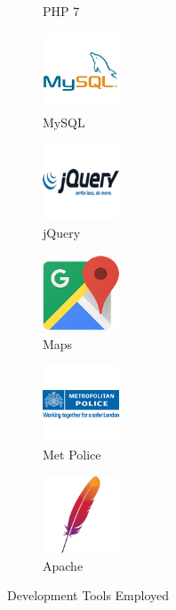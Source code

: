 \begin{figure}[H]
\begin{subfigure}[t]{0.9in}
		\caption{PHP 7}\label{fig:PHP_7}
	\end{subfigure}
	\quad
	\begin{subfigure}[t]{0.9in}
		\centering
		\includegraphics[width=0.9in]{images/icons/MySQL}
		\caption{MySQL}\label{fig:MySQL}		
	\end{subfigure}
	\quad
	\begin{subfigure}[t]{0.9in}
		\centering
		\includegraphics[width=0.9in]{images/icons/jQuery}
		\caption{jQuery}\label{fig:jQuery}
	\end{subfigure}
    \quad
	\begin{subfigure}[t]{0.9in}
		\centering
		\includegraphics[width=0.9in]{images/icons/Google_Maps}
		\caption{Maps}\label{fig:Google_Maps}
	\end{subfigure}
    \quad
	\begin{subfigure}[t]{0.9in}
		\centering
		\includegraphics[width=0.9in]{images/icons/Met_Police}
		\caption{Met Police}\label{fig:Met_Police}
	\end{subfigure}
    \quad
	\begin{subfigure}[t]{0.9in}
		\centering
		\includegraphics[width=0.9in]{images/icons/Apache}
		\caption{Apache}\label{fig:Apache}
	\end{subfigure}
	\caption{Development Tools Employed}\label{fig:DevelopmentTools}
\end{figure}


